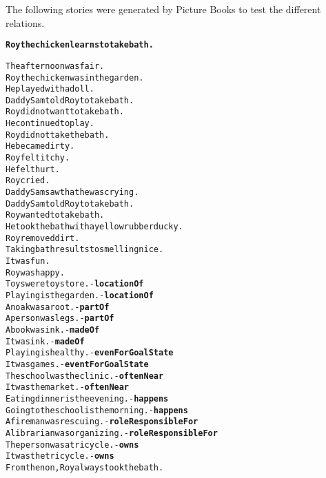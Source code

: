 %
%
%                 

\label{sec:appendixgenerated}

The following stories were generated by Picture Books to test the different relations.

\begin{alltt}
\textbf{Roy the chicken learns to take bath.}

The afternoon was fair.
Roy the chicken was in the garden.
He played with a doll.
Daddy Sam told Roy to take bath.
Roy did not want to take bath.
He continued to play.
Roy did not take the bath.
He became dirty.
Roy felt itchy.
He felt hurt.
Roy cried.
Daddy Sam saw that he was crying.
Daddy Sam told Roy to take bath.
Roy wanted to take bath.
He took the bath with a yellow rubber ducky.
Roy removed dirt.
Taking bath results to smelling nice.
It was fun.
Roy was happy.
Toys were toy store. - \textbf{locationOf}
Playing is the garden. - \textbf{locationOf}
An oak was a root. - \textbf{partOf}
A person was legs. - \textbf{partOf}
A book was ink. - \textbf{madeOf}
It was ink. - \textbf{madeOf}
Playing is healthy. - \textbf{evenForGoalState}
It was games. - \textbf{eventForGoalState}
The school was the clinic. - \textbf{oftenNear}
It was the market. - \textbf{oftenNear}
Eating dinner is the evening. - \textbf{happens}
Going to the school is the morning. - \textbf{happens}
A fireman was rescuing. - \textbf{roleResponsibleFor}
A librarian was organizing. - \textbf{roleResponsibleFor}
The person was a tricycle. - \textbf{owns}
It was the tricycle. - \textbf{owns}
From then on, Roy always took the bath.
\end{alltt}

